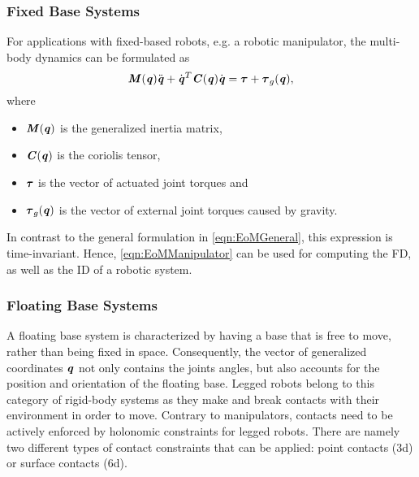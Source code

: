 \subsubsection{Fixed Base Systems}
For applications with fixed-based robots, e.g. a robotic manipulator, the multi-body dynamics can be formulated as
\begin{equation} \label{eqn:EoMManipulator}
\bm{\mathit{M}}(\bm{\mathit{q}})\ddot{\bm{\mathit{q}}}+\dot{\bm{\mathit{q}}}^T\bm{\mathit{C}}(\bm{\mathit{q}})\dot{\bm{\mathit{q}}}=\bm{\mathit{\tau}}+\bm{\mathit{\tau}}_g(\bm{\mathit{q}}),
\end{equation}
where 
\begin{itemize}
\item $\bm{\mathit{M}}(\bm{\mathit{q}})$ is the generalized inertia matrix, 
\item $\bm{\mathit{C}}(\bm{\mathit{q}})$ is the coriolis tensor, 
\item $\bm{\mathit{\tau}}$ is the vector of actuated joint torques and 
\item $\bm{\mathit{\tau}}_g(\bm{\mathit{q}})$ is the vector of external joint torques caused by gravity.
\end{itemize}
In contrast to the general formulation in \cref{eqn:EoMGeneral}, this expression is time-invariant. Hence, \cref{eqn:EoMManipulator} can be used for computing the \gls{FD}, as well as the \gls{ID} of a robotic system.
\subsubsection{Floating Base Systems}
A floating base system is characterized by having a base that is free to move, rather than being fixed in space. Consequently, the vector of generalized coordinates $\bm{\mathit{q}}$ not only contains the joints angles, but also accounts for the position and orientation of the floating base. Legged robots belong to this category of rigid-body systems as they make and break contacts with their environment in order to move. Contrary to manipulators, contacts need to be actively enforced by holonomic constraints for legged robots. There are namely two different types of contact constraints that can be applied: point contacts (3d) or surface contacts (6d). 

